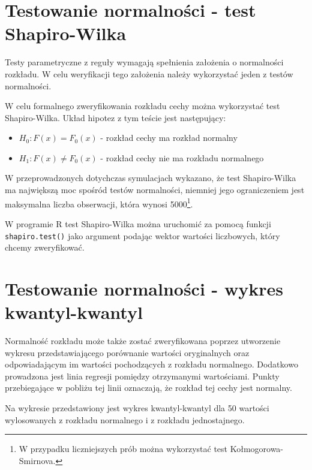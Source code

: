 \documentclass[
]{book}
\providecommand{\tightlist}{%
  \setlength{\itemsep}{0pt}\setlength{\parskip}{0pt}}
\begin{document}
\hypertarget{testowanie-normalnoux15bci---test-shapiro-wilka}{%
\section{Testowanie normalności - test Shapiro-Wilka}\label{testowanie-normalnoux15bci---test-shapiro-wilka}}

Testy parametryczne z reguły wymagają spełnienia założenia o normalności rozkładu. W celu weryfikacji tego założenia należy wykorzystać jeden z testów normalności.

W celu formalnego zweryfikowania rozkładu cechy można wykorzystać test Shapiro-Wilka. Układ hipotez z tym teście jest następujący:

\begin{itemize}
\tightlist
\item
  \(H_0: F(x) = F_0(x)\) - rozkład cechy ma rozkład normalny
\item
  \(H_1: F(x) \neq F_0(x)\) - rozkład cechy nie ma rozkładu normalnego
\end{itemize}

W przeprowadzonych dotychczas symulacjach wykazano, że test Shapiro-Wilka ma największą moc spośród testów normalności, niemniej jego ograniczeniem jest maksymalna liczba obserwacji, która wynosi 5000\footnote{W przypadku liczniejszych prób można wykorzystać test Kołmogorowa-Smirnova.}.

W programie R test Shapiro-Wilka można uruchomić za pomocą funkcji \texttt{shapiro.test()} jako argument podając wektor wartości liczbowych, który chcemy zweryfikować.

\hypertarget{testowanie-normalnoux15bci---wykres-kwantyl-kwantyl}{%
\section{Testowanie normalności - wykres kwantyl-kwantyl}\label{testowanie-normalnoux15bci---wykres-kwantyl-kwantyl}}

Normalność rozkładu może także zostać zweryfikowana poprzez utworzenie wykresu przedstawiającego porównanie wartości oryginalnych oraz odpowiadającym im wartości pochodzących z rozkładu normalnego. Dodatkowo prowadzona jest linia regresji pomiędzy otrzymanymi wartościami. Punkty przebiegające w pobliżu tej linii oznaczają, że rozkład tej cechy jest normalny.

Na wykresie przedstawiony jest wykres kwantyl-kwantyl dla 50 wartości wylosowanych z rozkładu normalnego i z rozkładu jednostajnego.
\end{document}
